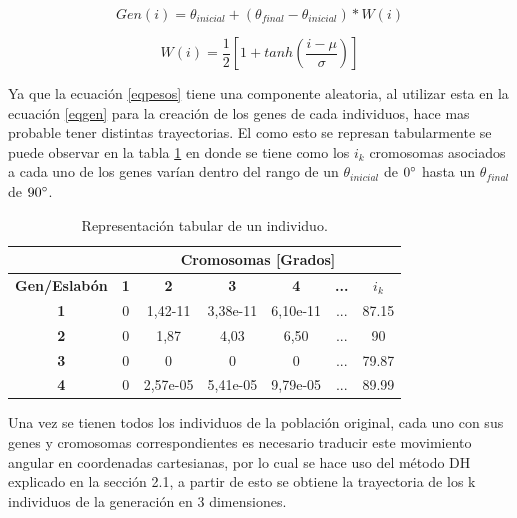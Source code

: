 \documentclass[12pt]{article}
\begin{document}
\begin{equation}
Gen(i)=\theta _{inicial}+(\theta _{final} - \theta _{inicial})*W(i)
\label{eqgen}
\end{equation}

\begin{equation}
W(i)=\frac{1}{2}\left [ 1+tanh  \left ( \frac{i- \mu} {\sigma} \right ) \right ]
\label{eqpesos}
\end{equation}

Ya que la ecuación \eqref{eqpesos} tiene una componente aleatoria, al utilizar esta en la ecuación \eqref{eqgen} para la creación de los genes de cada individuos, hace mas probable tener distintas trayectorias. El como esto se represan tabularmente se puede observar en la tabla \ref{tablagenes} en donde se tiene como los $i_{k}$ cromosomas asociados a cada uno de los genes varían dentro del rango de un $\theta _{inicial}$ de $0\degree$ hasta un $\theta _{final}$ de $90\degree$.


\begin{table}[]
\centering
\caption{Representación tabular de un individuo.}
\begin{tabular}{c|c|c|c|c|c|c|}
\cline{2-7}
\multicolumn{1}{l|}{} & \multicolumn{6}{c|}{\textbf{Cromosomas {[}Grados{]}}} \\ \hline
\multicolumn{1}{|c|}{\textbf{Gen/Eslabón}} & \textbf{1} & \textbf{2} & \textbf{3} & \textbf{4} & \textbf{...} & \textbf{$i_{k}$} \\ \hline
\multicolumn{1}{|c|}{\textbf{1}} & 0 & 1,42-11 & 3,38e-11 & 6,10e-11 & ... & 87.15 \\ \hline
\multicolumn{1}{|c|}{\textbf{2}} & 0 & 1,87 & 4,03 & 6,50 & ... & 90 \\ \hline
\multicolumn{1}{|c|}{\textbf{3}} & 0 & 0 & 0 & 0 & ... & 79.87 \\ \hline
\multicolumn{1}{|c|}{\textbf{4}} & 0 & 2,57e-05 & 5,41e-05 & 9,79e-05 & ... & 89.99 \\ \hline
\end{tabular}
\label{tablagenes}
\end{table}
Una vez se tienen todos los individuos de la población original, cada uno con sus genes y cromosomas correspondientes es necesario traducir este movimiento angular en coordenadas cartesianas, por lo cual se hace uso del método DH explicado en la sección 2.1, a partir de esto se obtiene la trayectoria de los k individuos de la generación en 3 dimensiones.
\end{document}
